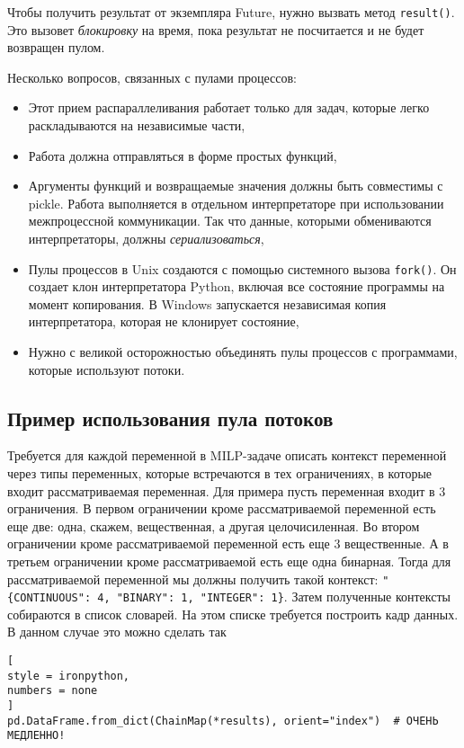 \documentclass[%
	11pt,
	a4paper,
	utf8,
		]{article}
\begin{document}
Чтобы получить результат от экземпляра Future, нужно вызвать метод \texttt{result()}. Это вызовет \emph{блокировку} на время, пока результат не посчитается и не будет возвращен пулом.

Несколько вопросов, связанных с пулами процессов:
\begin{itemize}
	\item Этот прием распараллеливания работает только для задач, которые легко раскладываются на независимые части,
	
	\item Работа должна отправляться в форме простых функций,
	
	\item Аргументы функций и возвращаемые значения должны быть совместимы с pickle. Работа выполняется в отдельном интерпретаторе при использовании межпроцессной коммуникации. Так что данные, которыми обмениваются интерпретаторы, должны \emph{сериализоваться},
	
	\item Пулы процессов в Unix создаются с помощью системного вызова \texttt{fork()}. Он создает клон интерпретатора Python, включая все состояние программы на момент копирования. В Windows запускается независимая копия интерпретатора, которая не клонирует состояние,
	
	\item Нужно с великой осторожностью объединять пулы процессов с программами, которые используют потоки.
\end{itemize}

\subsection{Пример использования пула потоков}

Требуется для каждой переменной в MILP-задаче описать контекст переменной через типы переменных, которые встречаются в тех ограничениях, в которые входит рассматриваемая переменная. Для примера пусть переменная входит в 3 ограничения. В первом ограничении кроме рассматриваемой переменной есть еще две: одна, скажем, вещественная, а другая целочисиленная. Во втором ограничении кроме рассматриваемой переменной есть еще 3 вещественные. А в третьем ограничении кроме рассматриваемой есть еще одна бинарная. Тогда для рассматриваемой переменной мы должны получить такой контекст: \verb|"{CONTINUOUS": 4, "BINARY": 1, "INTEGER": 1}|. Затем полученные контексты собираются в список словарей. На этом списке требуется построить кадр данных. В данном случае это можно сделать так
\begin{lstlisting}[
style = ironpython,
numbers = none
]
pd.DataFrame.from_dict(ChainMap(*results), orient="index")  # ОЧЕНЬ МЕДЛЕННО!
\end{lstlisting}
\end{document}
